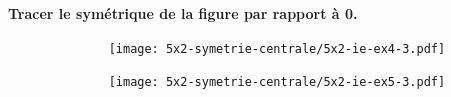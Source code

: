 \documentclass[11pt]{article}
\begin{document}
\textbf{Tracer le symétrique de la figure par rapport à 0.}

\begin{multicols}{2}

  \begin{figure}[H]
        \centering
        \texttt{[image: 5x2-symetrie-centrale/5x2-ie-ex4-3.pdf]}
  \end{figure}

  \begin{figure}[H]
        \centering
        \texttt{[image: 5x2-symetrie-centrale/5x2-ie-ex5-3.pdf]}
  \end{figure}

\end{multicols}
\end{document}
